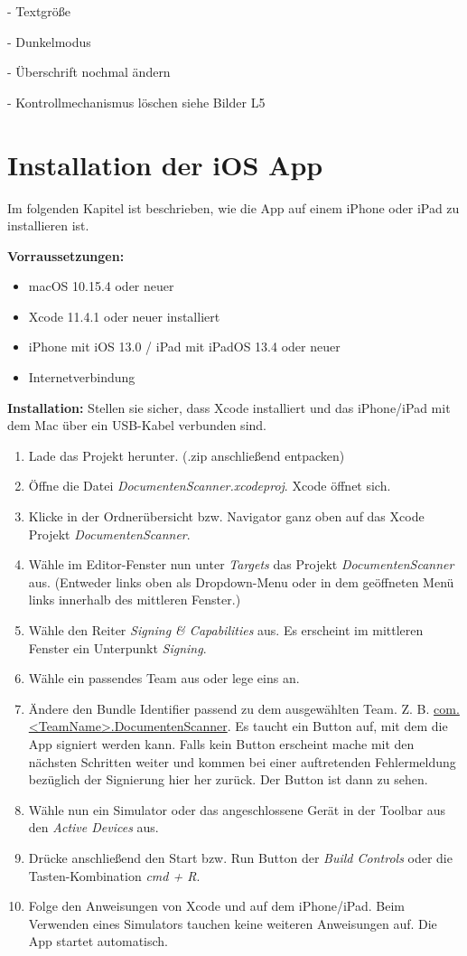\documentclass[notables, nomenclature, oneside, 150]{HSMW-Thesis}
\begin{document}
	- Textgröße
	
	- Dunkelmodus
	
	- Überschrift nochmal ändern
	
	- Kontrollmechanismus löschen siehe Bilder L5
	
	
\chapter{Installation der iOS App}\label{ch:installation}
	Im folgenden Kapitel ist beschrieben, wie die App auf einem iPhone oder iPad zu installieren ist.
	
	\textbf{Vorraussetzungen:}
	\begin{itemize}
		\item macOS 10.15.4 oder neuer
		\item Xcode 11.4.1 oder neuer installiert
		\item iPhone mit iOS 13.0 / iPad mit iPadOS 13.4 oder neuer
		\item Internetverbindung
	\end{itemize}
	
	\textbf{Installation:}
	Stellen sie sicher, dass Xcode installiert und das iPhone/iPad mit dem Mac über ein USB-Kabel verbunden sind.
	\begin{enumerate}
		\item Lade das Projekt herunter. (.zip anschließend entpacken)
		\item Öffne die Datei \textit{DocumentenScanner.xcodeproj}. Xcode öffnet sich.
		\item Klicke in der Ordnerübersicht bzw. Navigator ganz oben auf das Xcode Projekt \textit{DocumentenScanner}.
		\item Wähle im Editor-Fenster nun unter \textit{Targets} das Projekt \textit{DocumentenScanner} aus. (Entweder links oben als Dropdown-Menu oder in dem geöffneten Menü links innerhalb des mittleren Fenster.)
		\item Wähle den Reiter \textit{Signing \& Capabilities} aus. Es erscheint im mittleren Fenster ein Unterpunkt \textit{Signing}.
		\item Wähle ein passendes Team aus oder lege eins an.
		\item Ändere den Bundle Identifier passend zu dem ausgewählten Team. Z. B. \url{com.<TeamName>.DocumentenScanner}. Es taucht ein Button auf, mit dem die App signiert werden kann. Falls kein Button erscheint mache mit den nächsten Schritten weiter und kommen bei einer auftretenden Fehlermeldung bezüglich der Signierung hier her zurück. Der Button ist dann zu sehen.
		\item Wähle nun ein Simulator oder das angeschlossene Gerät in der Toolbar aus den \textit{Active Devices} aus.
		\item Drücke anschließend den Start bzw. Run Button der \textit{Build Controls} oder die Tasten-Kombination \textit{cmd + R}.
		\item Folge den Anweisungen von Xcode und auf dem iPhone/iPad. Beim Verwenden eines Simulators tauchen keine weiteren Anweisungen auf. Die App startet automatisch. 
	\end{enumerate}
	
\end{document}
